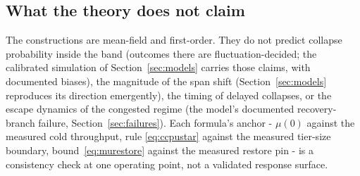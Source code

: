 \subsection{What the theory does not claim}
\label{sec:theory-scope}

The constructions are mean-field and first-order. They do not
predict collapse probability inside the band (outcomes there are
fluctuation-decided; the calibrated simulation of Section~\ref{sec:models} carries
those claims, with documented biases), the magnitude of the span
shift (Section~\ref{sec:models} reproduces its direction emergently), the timing of
delayed collapses, or the escape dynamics of the congested regime
(the model's documented recovery-branch failure, Section~\ref{sec:failures}). Each
formula's anchor - $\mu(0)$ against the measured cold throughput, rule
\eqref{eq:ccpustar} against the measured tier-size boundary, bound~\eqref{eq:murestore} against the
measured restore pin - is a consistency check at one operating
point, not a validated response surface.
